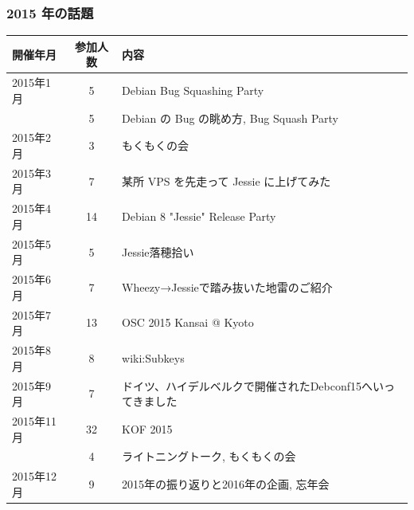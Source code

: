 \documentclass[cjk,dvipdfmx,10pt,compress,%
hyperref={bookmarks=true,bookmarksnumbered=true,bookmarksopen=false,%
colorlinks=false,%
pdftitle={第 121 回 関西 Debian 勉強会},%
pdfauthor={倉敷・のがた・佐々木・かわだ},%
pdfsubject={資料},%
}]{beamer}
\begin{document}
\begin{frame}[fragile]
  \frametitle{2015 年の話題}
    \begin{table}
        \begin{center}
          \begin{tabular}{|l|c|p{20em}|}
            \hline
            開催年月  & 参加人数 & 内容 \\
            \hline
            2015年1月 &5      & Debian Bug Squashing Party \\
                      &5      & Debian の Bug の眺め方, Bug Squash Party \\
            2015年2月 &3      & もくもくの会 \\
            2015年3月 &7      & 某所 VPS を先走って Jessie に上げてみた \\
            2015年4月 &14     & Debian 8 "Jessie" Release Party \\
            2015年5月 &5      & Jessie落穂拾い \\
            2015年6月 &7      & Wheezy→Jessieで踏み抜いた地雷のご紹介 \\
            2015年7月 &13     & OSC 2015 Kansai @ Kyoto \\
            2015年8月 &8      & wiki:Subkeys \\
            2015年9月 &7      & ドイツ、ハイデルベルクで開催されたDebconf15へいってきました \\
            2015年11月&32     & KOF 2015 \\
                      &4      & ライトニングトーク, もくもくの会 \\
            2015年12月&9      & 2015年の振り返りと2016年の企画, 忘年会 \\
            \hline
          \end{tabular}
        \end{center}
    \end{table}
\end{frame}
\end{document}
